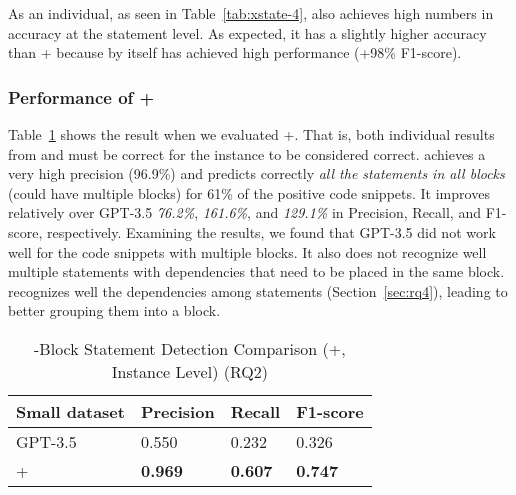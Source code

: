 As an individual, as seen in Table~\ref{tab:xstate-4}, {\tool} also
achieves high numbers in accuracy at the statement level. As
expected, it has a slightly higher accuracy than {\xblock}+{\xstate}
because {\xblock} by itself has achieved high performance (+98\% F1-score).

\subsubsection{Performance of {\xblock}+{\xstate}}



Table~\ref{tab:xstate-1} shows the result when we evaluated
{\xstate}+{\xblock}. That is, both individual results from {\xblock}
and {\xstate} must be correct for the instance to be considered
correct. {\tool} achieves a very high precision (96.9\%) and predicts
correctly {\em all the statements in all  blocks} (could
have multiple blocks) for 61\% of the positive code snippets. It
improves relatively over GPT-3.5 {\em 76.2\%}, {\em 161.6\%}, and {\em
  129.1\%} in Precision, Recall, and F1-score, respectively. Examining
the results, we found that GPT-3.5 did not work well for the code
snippets with multiple  blocks. It also does not
recognize well multiple statements with dependencies that need to be
placed in the same  block. {\tool} recognizes well the
dependencies among statements (Section~\ref{sec:rq4}), leading to
better grouping them into a  block.

\begin{table}[htpb]
  \caption{-Block Statement Detection Comparison ({\xblock}+{\xstate}, Instance Level) (RQ2)}
  \vspace{-12pt}
  \small
	\begin{center}
		\renewcommand{\arraystretch}{1}
		\begin{tabular}{| p{3.05cm}<{\centering} | p{1.2cm}<{\centering} | p{1.2cm}<{\centering}| p{1.2cm}<{\centering}|}
		  \hline
		Small dataset	  & Precision  & Recall & F1-score \\
			\hline
                        GPT-3.5 & 0.550 & 0.232 & 0.326 \\
			\hline
			\xblock + \xstate   & \textbf{0.969}  &  \textbf{0.607} & \textbf{0.747}\\
			\hline
		\end{tabular}
		\label{tab:xstate-1}
	\end{center}
\end{table}

